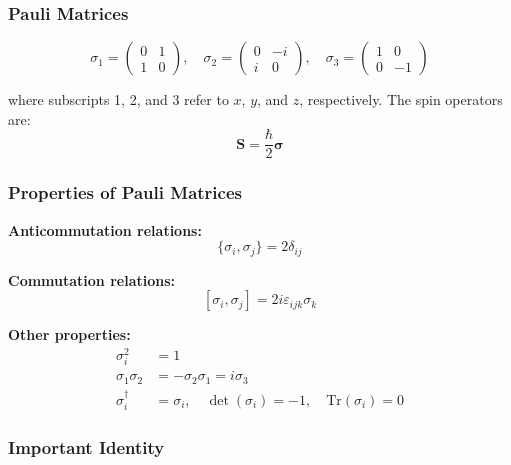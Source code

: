 \documentclass[11pt,a4paper]{article}
\begin{document}
\subsubsection{Pauli Matrices}

\begin{equation}
\boxed{\sigma_1 = \begin{pmatrix} 0 & 1 \\ 1 & 0 \end{pmatrix}, \quad \sigma_2 = \begin{pmatrix} 0 & -i \\ i & 0 \end{pmatrix}, \quad \sigma_3 = \begin{pmatrix} 1 & 0 \\ 0 & -1 \end{pmatrix}}
\tag{3.50}
\end{equation}

where subscripts 1, 2, and 3 refer to $x$, $y$, and $z$, respectively. The spin operators are:
\begin{equation}
\mathbf{S} = \frac{\hbar}{2}\boldsymbol{\sigma}
\end{equation}

\subsubsection{Properties of Pauli Matrices}

\textbf{Anticommutation relations:}
\begin{equation}
\boxed{\{\sigma_i, \sigma_j\} = 2\delta_{ij}}
\tag{3.52}
\end{equation}

\textbf{Commutation relations:}
\begin{equation}
\boxed{[\sigma_i, \sigma_j] = 2i\varepsilon_{ijk}\sigma_k}
\tag{3.53}
\end{equation}

\textbf{Other properties:}
\begin{align}
\sigma_i^2 &= 1 \tag{3.51a} \\
\sigma_1\sigma_2 &= -\sigma_2\sigma_1 = i\sigma_3 \tag{3.54} \\
\sigma_i^\dagger &= \sigma_i, \quad \det(\sigma_i) = -1, \quad \text{Tr}(\sigma_i) = 0 \tag{3.55}
\end{align}

\subsubsection{Important Identity}
\end{document}

